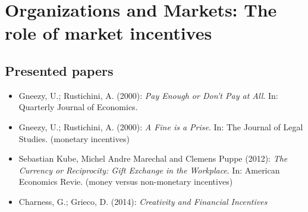 

\chapter{Organizations and Markets: The role of market incentives}

\section{Presented papers}

\begin{itemize}
	\item Gneezy, U.; Rustichini, A. (2000): \textit{Pay Enough or Don't Pay at All}. In: Quarterly Journal of Economics.
	\item Gneezy, U.; Rustichini, A. (2000): \textit{A Fine is a Prise}. In: The Journal of Legal Studies. (monetary incentives)
	\item Sebastian Kube, Michel Andre Marechal and Clemens Puppe (2012): \textit{The Currency or Reciprocity: Gift Exchange in the Workplace}. In: American Economics Revie. (money versus non-monetary incentives)
	\item Charness, G.; Grieco, D. (2014): \textit{Creativity and Financial Incentives} 
\end{itemize}


\newpage